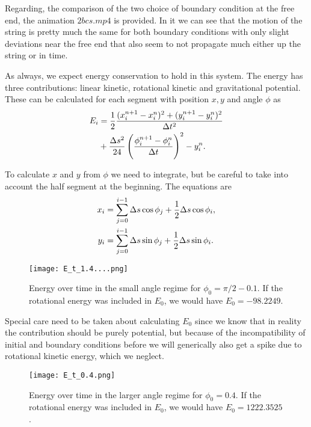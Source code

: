 \documentclass[10pt,a4paper,twocolumn]{article}
\begin{document}
Regarding, the comparison of the two choice of boundary condition at the free end, the animation $2bcs.mp4$ is provided. In it we can see that the motion of the string is pretty much the same for both boundary conditions with only slight deviations near the free end that also seem to not propagate much either up the string or in time.

As always, we expect energy conservation to hold in this system. The energy has three contributions: linear kinetic, rotational kinetic and gravitational potential. These can be calculated for each segment with position $x,y$ and angle $\phi$ as
%
\begin{align}
    E_i &= \frac{1}{2} \frac{(x_i^{n+1} - x_i^n)^2 + (y_i^{n+1} - y_i^n)^2}{\Delta t^2}\notag\\
    &+ \frac{\Delta s^2}{24} \left(\frac{\phi_i^{n+1} - \phi_i^n}{\Delta t}\right)^2 - y_i^n.
\end{align}

To calculate $x$ and $y$ from $\phi$ we need to integrate, but be careful to take into account the half segment at the beginning. The equations are
%
\begin{align}
    x_i &= \sum_{j=0}^{i-1} \Delta s \cos \phi_j + \frac{1}{2} \Delta s \cos \phi_i,\notag\\
    y_i &= \sum_{j=0}^{i-1} \Delta s \sin \phi_j + \frac{1}{2} \Delta s \sin \phi_i.
\end{align}

\begin{figure}[!h]
    \centering
    \texttt{[image: E\_t\_1.4....png]}
    \caption{Energy over time in the small angle regime for $\phi_0=\pi/2 - 0.1$. If the rotational energy was included in $E_0$, we would have $E_0 = -98.2249$.}
    \label{fig:E_t}
\end{figure}

Special care need to be taken about calculating $E_0$ since we know that in reality the contribution should be purely potential, but because of the incompatibility of initial and boundary conditions before we will generically also get a spike due to rotational kinetic energy, which we neglect.

\begin{figure}[!t]
    \centering
    \texttt{[image: E\_t\_0.4.png]}
    \caption{Energy over time in the larger angle regime for $\phi_0=0.4$. If the rotational energy was included in $E_0$, we would have $E_0 = 1222.3525$.}
    \label{fig:E_t_alt}
\end{figure}
\end{document}
